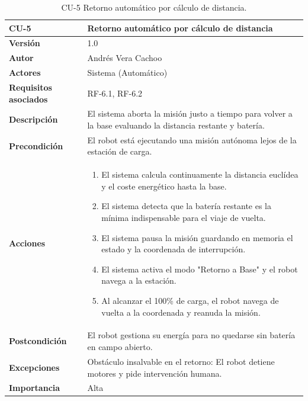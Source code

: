\begin{table}[H]
	\centering
	\begin{tabularx}{\linewidth}{ p{} p{} }
		\toprule
		\textbf{CU-5}    & \textbf{Retorno automático por cálculo de distancia}\\
		\toprule
		\textbf{Versión}              & 1.0    \\
		\textbf{Autor}                & Andrés Vera Cachoo \\
		\textbf{Actores}              & Sistema (Automático) \\
		\textbf{Requisitos asociados} & RF-6.1, RF-6.2 \\
		\textbf{Descripción}          & El sistema aborta la misión justo a tiempo para volver a la base evaluando la distancia restante y batería. \\
		\textbf{Precondición}         & El robot está ejecutando una misión autónoma lejos de la estación de carga. \\
		\textbf{Acciones}             &
		\begin{enumerate}
			\def\labelenumi{\arabic{enumi}.}
			\tightlist
			\item El sistema calcula continuamente la distancia euclídea y el coste energético hasta la base.
			\item El sistema detecta que la batería restante es la mínima indispensable para el viaje de vuelta.
			\item El sistema pausa la misión guardando en memoria el estado y la coordenada de interrupción.
			\item El sistema activa el modo "Retorno a Base" y el robot navega a la estación.
            \item Al alcanzar el 100\% de carga, el robot navega de vuelta a la coordenada y reanuda la misión.
		\end{enumerate}\\
		\textbf{Postcondición}        & El robot gestiona su energía para no quedarse sin batería en campo abierto. \\
		\textbf{Excepciones}          & Obstáculo insalvable en el retorno: El robot detiene motores y pide intervención humana. \\
		\textbf{Importancia}          & Alta \\
		\bottomrule
	\end{tabularx}
	\caption{CU-5 Retorno automático por cálculo de distancia.}
\end{table}

